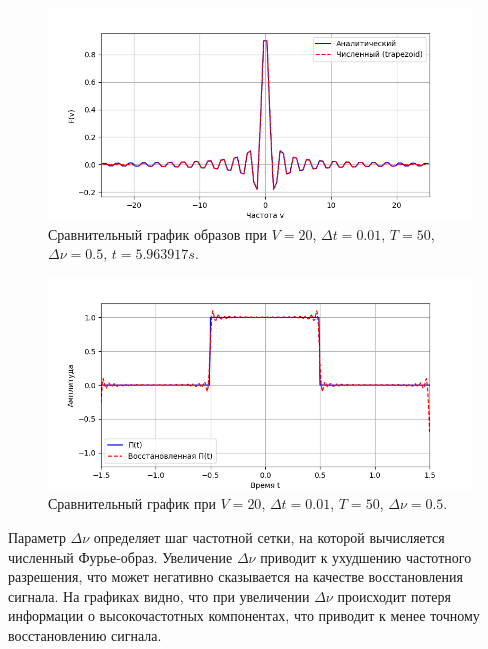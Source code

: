 \documentclass[a4paper]{article}
\begin{document}
\begin{figure}[H]
  \centering
  \includegraphics[width=\textwidth]{src/task_1_1/freq_50_0.01_20_0.5.png}
  \caption{Сравнительный график образов при $V=20$, $\Delta t=0.01$, $T=50$, $\Delta \nu=0.5$, $t=5.963917 s$.} 
\end{figure}
\begin{figure}[H]
  \centering
  \includegraphics[width=\textwidth]{src/task_1_1/time_50_0.01_20_0.5.png}
  \caption{Сравнительный график при $V=20$, $\Delta t=0.01$, $T=50$, $\Delta \nu=0.5$.} 
\end{figure}
\noindent Параметр $\Delta \nu$ определяет шаг частотной сетки, на которой вычисляется численный Фурье-образ. Увеличение $\Delta \nu$ приводит к ухудшению частотного разрешения, что может негативно сказывается на качестве восстановления сигнала. На графиках видно, что при увеличении $\Delta \nu$ происходит потеря информации о высокочастотных компонентах, что приводит к менее точному восстановлению сигнала.
\end{document}
